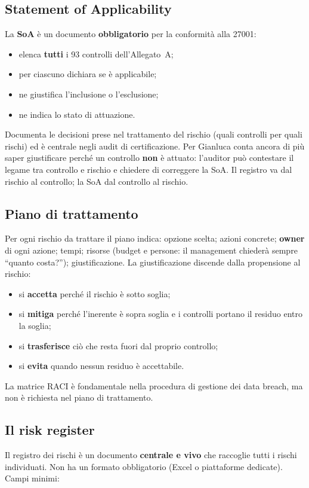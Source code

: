 \subsection{Statement of Applicability}
La \textbf{SoA} è un documento \textbf{obbligatorio} per la conformità alla 27001:
\begin{itemize}
  \item elenca \textbf{tutti} i 93 controlli dell'Allegato~A;
  \item per ciascuno dichiara se è applicabile;
  \item ne giustifica l'inclusione o l'esclusione;
  \item ne indica lo stato di attuazione.
\end{itemize}
Documenta le decisioni prese nel trattamento del rischio (quali controlli per quali rischi) ed è centrale
negli audit di certificazione. Per Gianluca conta ancora di più saper giustificare perché un controllo
\textbf{non} è attuato: l'auditor può contestare il legame tra controllo e rischio e chiedere di correggere
la SoA. Il registro va dal rischio al controllo; la SoA dal controllo al rischio.

\subsection{Piano di trattamento}
Per ogni rischio da trattare il piano indica: opzione scelta; azioni concrete; \textbf{owner} di ogni azione;
tempi; risorse (budget e persone: il management chiederà sempre ``quanto costa?''); giustificazione. La
giustificazione discende dalla propensione al rischio:
\begin{itemize}
  \item si \textbf{accetta} perché il rischio è sotto soglia;
  \item si \textbf{mitiga} perché l'inerente è sopra soglia e i controlli portano il residuo entro la soglia;
  \item si \textbf{trasferisce} ciò che resta fuori dal proprio controllo;
  \item si \textbf{evita} quando nessun residuo è accettabile.
\end{itemize}
La matrice RACI è fondamentale nella procedura di gestione dei data breach, ma non è richiesta nel piano di
trattamento.

\subsection{Il risk register}
\label{sec:iso-register}
Il registro dei rischi è un documento \textbf{centrale e vivo} che raccoglie tutti i rischi individuati.
Non ha un formato obbligatorio (Excel o piattaforme dedicate). Campi minimi:

